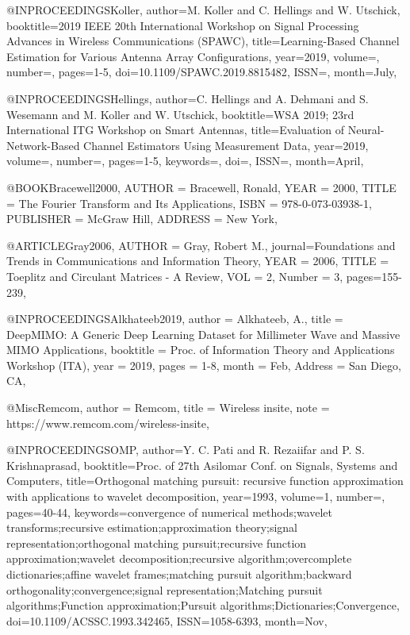 \documentclass[12pt, draftclsnofoot, onecolumn]{IEEEtran}
\begin{document}
@INPROCEEDINGS{Koller,
author={M. {Koller} and C. {Hellings} and W. {Utschick}},
booktitle={2019 IEEE 20th International Workshop on Signal Processing Advances in Wireless Communications (SPAWC)},
title={Learning-Based Channel Estimation for Various Antenna Array Configurations},
year={2019},
volume={},
number={},
pages={1-5},
doi={10.1109/SPAWC.2019.8815482},
ISSN={},
month={July},}

@INPROCEEDINGS{Hellings,
author={C. {Hellings} and A. {Dehmani} and S. {Wesemann} and M. {Koller} and W. {Utschick}},
booktitle={WSA 2019; 23rd International ITG Workshop on Smart Antennas},
title={Evaluation of Neural-Network-Based Channel Estimators Using Measurement Data},
year={2019},
volume={},
number={},
pages={1-5},
keywords={},
doi={},
ISSN={},
month={April},}

@BOOK{Bracewell2000,
	AUTHOR = {Bracewell, Ronald},
	YEAR = {2000},
	TITLE = {The Fourier Transform and Its Applications},
	ISBN = {978-0-073-03938-1},
	PUBLISHER = {McGraw Hill},
	ADDRESS = {New York},
}

@ARTICLE{Gray2006,
	AUTHOR = {Gray, Robert M.},
	journal={Foundations and Trends\textsuperscript{\textregistered} in Communications and Information Theory},
	YEAR = {2006},
	TITLE = {Toeplitz and Circulant Matrices - {A} Review},
	VOL = {2},
	Number = {3},
	pages={155-239},
}

@INPROCEEDINGS{Alkhateeb2019,
author = {Alkhateeb, A.},
title = {DeepMIMO: A Generic Deep Learning Dataset for Millimeter Wave and Massive {MIMO} Applications},
booktitle = {Proc. of Information Theory and Applications Workshop (ITA)},
year = {2019},
pages = {1-8},
month = {Feb},
Address = {San Diego, CA}, }

@Misc{Remcom,
 author = {Remcom},
 title = {Wireless insite},
 note = {https://www.remcom.com/wireless-insite},
}

@INPROCEEDINGS{OMP,
author={Y. C. {Pati} and R. {Rezaiifar} and P. S. {Krishnaprasad}},
booktitle={Proc. of 27th Asilomar Conf. on Signals, Systems and Computers},
title={Orthogonal matching pursuit: recursive function approximation with applications to wavelet decomposition},
year={1993},
volume={1},
number={},
pages={40-44},
keywords={convergence of numerical methods;wavelet transforms;recursive estimation;approximation theory;signal representation;orthogonal matching pursuit;recursive function approximation;wavelet decomposition;recursive algorithm;overcomplete dictionaries;affine wavelet frames;matching pursuit algorithm;backward orthogonality;convergence;signal representation;Matching pursuit algorithms;Function approximation;Pursuit algorithms;Dictionaries;Convergence},
doi={10.1109/ACSSC.1993.342465},
ISSN={1058-6393},
month={Nov},}
\end{document}
